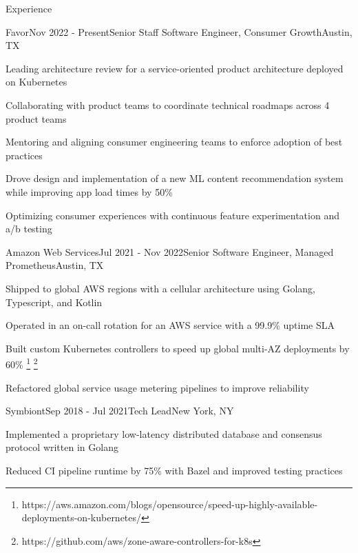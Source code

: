 \documentclass[
	10pt, %
]{resume} %
\begin{document}
\begin{rSection}{Experience}

	\begin{rSubsection}{Favor}{Nov 2022 - Present}{Senior Staff Software Engineer, Consumer Growth}{Austin, TX}
        \item Leading architecture review for a service-oriented product architecture deployed on Kubernetes
        \item Collaborating with product teams to coordinate technical roadmaps across 4 product teams
        \item Mentoring and aligning consumer engineering teams to enforce adoption of best practices
        \item Drove design and implementation of a new ML content recommendation system while improving app load times by 50\%
        \item Optimizing consumer experiences with continuous feature experimentation and a/b testing
	\end{rSubsection}


    \begin{rSubsection}{Amazon Web Services}{Jul 2021 - Nov 2022}{Senior Software Engineer, Managed Prometheus}{Austin, TX}
        \item Shipped to global AWS regions with a cellular architecture using Golang, Typescript, and Kotlin
        \item Operated in an on-call rotation for an AWS service with a 99.9\% uptime SLA
        \item Built custom Kubernetes controllers to speed up global multi-AZ deployments by 60\% \footnote{https://aws.amazon.com/blogs/opensource/speed-up-highly-available-deployments-on-kubernetes/} \footnote{https://github.com/aws/zone-aware-controllers-for-k8s}
        \item Refactored global service usage metering pipelines to improve reliability
    \end{rSubsection}
    

    \begin{rSubsection}{Symbiont}{Sep 2018 - Jul 2021}{Tech Lead}{New York, NY}
        \item Implemented a proprietary low-latency distributed database and consensus protocol written in Golang
        \item Reduced CI pipeline runtime by 75\% with Bazel and improved testing practices
    \end{rSubsection}


\end{rSection}
\end{document}
